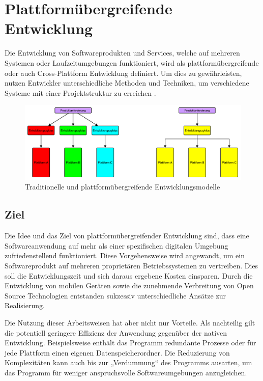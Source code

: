 \chapter{Plattformübergreifende Entwicklung}
Die Entwicklung von Softwareprodukten und Services, welche auf mehreren Systemen oder Laufzeitumgebungen funktioniert, wird als plattformübergreifende oder auch Cross-Plattform Entwicklung definiert. Um dies zu gewährleisten, nutzen Entwickler unterschiedliche Methoden und Techniken, um verschiedene Systeme mit einer Projektstruktur zu erreichen \citep{cross_plattform_explanation}.

\begin{figure}[htbp]
	\centering
	\includegraphics[width=1\textwidth]{Bilder/nativ_vs_cross}
	\caption{Traditionelle und plattformübergreifende Entwicklungsmodelle}\label{graph_nativ_vs_cross}
\end{figure}


\section{Ziel}
Die Idee und das Ziel von plattformübergreifender Entwicklung sind, dass eine Softwareanwendung auf mehr als einer spezifischen digitalen Umgebung zufriedenstellend funktioniert. Diese Vorgehensweise wird angewandt, um ein Softwareprodukt auf mehreren proprietären Betriebssystemen zu vertreiben. Dies soll die Entwicklungszeit und sich daraus ergebene Kosten einsparen. Durch die Entwicklung von mobilen Geräten sowie die zunehmende Verbreitung von Open Source Technologien entstanden sukzessiv unterschiedliche Ansätze zur Realisierung.

Die Nutzung dieser Arbeitsweisen hat aber nicht nur Vorteile. Als nachteilig gilt die potentiell geringere Effizienz der Anwendung gegenüber der nativen Entwicklung. Beispielsweise enthält das Programm redundante Prozesse oder für jede Plattform einen eigenen Datenspeicherordner. Die Reduzierung von Komplexitäten kann auch bis zur „Verdummung“ des Programms ausarten, um das Programm für weniger anspruchsvolle Softwareumgebungen anzugleichen. 


